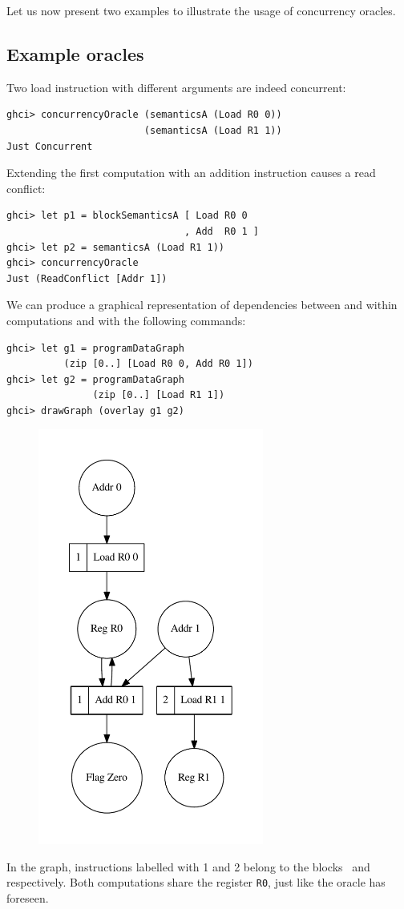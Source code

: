 Let us now present two examples to illustrate the usage of concurrency
oracles.

\subsection{Example oracles}

Two load instruction with different arguments are indeed concurrent:

\begin{verbatim}
ghci> concurrencyOracle (semanticsA (Load R0 0))
                        (semanticsA (Load R1 1))
Just Concurrent
\end{verbatim}

\begin{minipage}{0.55\textwidth}
Extending the first computation with an addition instruction causes a read conflict:
\begin{verbatim}
ghci> let p1 = blockSemanticsA [ Load R0 0
                               , Add  R0 1 ]
ghci> let p2 = semanticsA (Load R1 1))
ghci> concurrencyOracle
Just (ReadConflict [Addr 1])
\end{verbatim}
We can produce a graphical
representation of dependencies between and
within computations and  with
the following commands:
\begin{verbatim}
ghci> let g1 = programDataGraph
          (zip [0..] [Load R0 0, Add R0 1])
ghci> let g2 = programDataGraph
               (zip [0..] [Load R1 1])
ghci> drawGraph (overlay g1 g2)
\end{verbatim}
\end{minipage}%
\hfill
\begin{minipage}{0.35\textwidth}
\begin{figure}[H]
\includegraphics[width=20em]{img/oracle2.pdf}
\end{figure}
\end{minipage}%

\noindent In the graph, instructions labelled with 1 and 2 belong to the blocks~
and~ respectively. Both computations share the register
\texttt{R0}, just like the oracle has foreseen.

